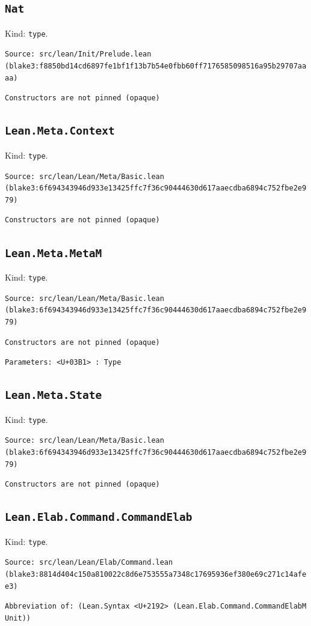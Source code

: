 \documentclass[11pt]{article}
\begin{document}
\subsection*{\texttt{Nat}}
\noindent Kind: \texttt{type}.\par
\noindent \texttt{Source: src/lean/Init/Prelude.lean (blake3:f8850bd14cd6897fe1bf1f13b7b54e0fbb60ff7176585098516a95b29707aaaa)}\par
\noindent \texttt{Constructors are not pinned (opaque)}\par
\subsection*{\texttt{Lean.Meta.Context}}
\noindent Kind: \texttt{type}.\par
\noindent \texttt{Source: src/lean/Lean/Meta/Basic.lean (blake3:6f694343946d933e13425ffc7f36c90444630d617aaecdba6894c752fbe2e979)}\par
\noindent \texttt{Constructors are not pinned (opaque)}\par
\subsection*{\texttt{Lean.Meta.MetaM}}
\noindent Kind: \texttt{type}.\par
\noindent \texttt{Source: src/lean/Lean/Meta/Basic.lean (blake3:6f694343946d933e13425ffc7f36c90444630d617aaecdba6894c752fbe2e979)}\par
\noindent \texttt{Constructors are not pinned (opaque)}\par
\noindent \texttt{Parameters: <U+03B1> : Type}\par
\subsection*{\texttt{Lean.Meta.State}}
\noindent Kind: \texttt{type}.\par
\noindent \texttt{Source: src/lean/Lean/Meta/Basic.lean (blake3:6f694343946d933e13425ffc7f36c90444630d617aaecdba6894c752fbe2e979)}\par
\noindent \texttt{Constructors are not pinned (opaque)}\par
\subsection*{\texttt{Lean.Elab.Command.CommandElab}}
\noindent Kind: \texttt{type}.\par
\noindent \texttt{Source: src/lean/Lean/Elab/Command.lean (blake3:8814d404c150a810022c8d6e753555a7348c17695936ef380e69c271c14afee3)}\par
\noindent \texttt{Abbreviation of: (Lean.Syntax <U+2192> (Lean.Elab.Command.CommandElabM Unit))}\par
\end{document}
